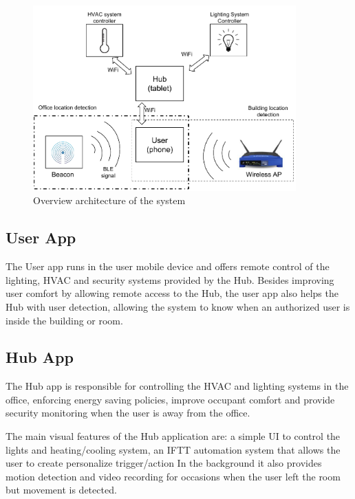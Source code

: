 \begin{figure}[h]
\centering
\includegraphics[width=0.9\textwidth]{Figures/harware_arch}
\caption{Overview architecture of the system}
\label{software1}
\end{figure}


\subsection{User App}

The User app runs in the user mobile device and offers remote control of the lighting, \ac{HVAC} and security systems provided by the Hub. Besides improving user comfort by allowing remote access to the Hub, the user app also helps the Hub with user detection, allowing the system to know when an authorized user is inside the building or room.



\subsection{Hub App}

The Hub app is responsible for controlling the \ac{HVAC} and lighting systems in the office, enforcing energy saving policies, improve occupant comfort and provide security monitoring when the user is away from the office.

The main visual features of the Hub application are: a simple \ac{UI} to control the lights and heating/cooling system, an \ac{IFTT} automation system that allows the user to create personalize trigger/action In the background it also provides motion detection and video recording for occasions when the user left the room but movement is detected.



